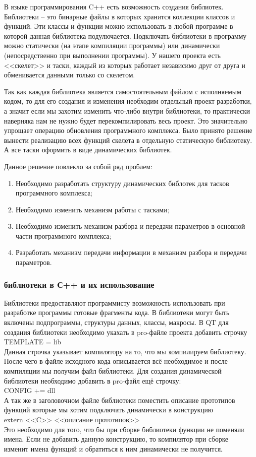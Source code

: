 В языке программирования C++ есть возможность создания библиотек. Библиотеки -- это бинарные файлы в которых хранится коллекции классов и функций. Эти классы и функции можно использовать в любой программе в которой данная библиотека подулючается. Подключать библиотеки в программу можно статически (на этапе компиляции программы) или динамически (непосредственно при выполнении программы). У нашего проекта есть <<скелет>> и таски, каждый из которых работает независимо друг от друга и обменивается данными только со скелетом. 

Так как каждая библиотека является самостоятельным файлом с исполняемым кодом, то для его создания и изменения необходим отдельный проект разработки, а значит если мы захотим изменить что-либо внутри библиотеки, то практически наверняка нам не нужно будет перекомпилировать весь проект. Это значительно упрощает операцию обновления программного комплекса. Было принято решение вынести реализацию всех функций скелета в отдельную статическую библиотеку. А все таски оформить в виде динамических библиотек. 

Данное решение повлекло за собой ряд проблем:
\begin{enumerate}
\item Необходимо разработать структуру динамических библотек для тасков программного комплекса;
\item Необходимо изменить механизм работы с тасками;
\item Необходимо изменить механизм разбора и передачи параметров в основной части программного комплекса;
\item Разработать механизм передачи информации в механизм разбора и передачи параметров.
\end{enumerate}

\subsubsection{библиотеки в С++ и их использование}

Библиотеки предоставляют программисту возможность использовать при разработке программы готовые фрагменты кода. В библиотеки могут быть включены подпрограммы, структуры данных, классы, макросы. В QT для создания библиотеки необходимо укахать в pro-файле проекта добавить строчку \\
TEMPLATE = lib\\
Данная строчка указывает компилятору на то, что мы компилируем библиотеку. После чего в файле исходного кода описывается всё необходимое и после компиляции мы получим файл библиотеки. Для создания динамической библиотеки необходимо добавить в pro-файл ещё строчку: \\
CONFIG += dll\\
А так же в заголовочном файле библиотеки поместить описание прототипов функций которые мы хотим подключать динамически в конструкцию\\
extern <<C>>{ <<описание прототипов>> }\\
Это необходимо для того, что бы при сборке библиотеки функции не поменяли имена. Если не добавить данную конструкцию, то компилятор при сборке изменит имена функций и обратиться к ним динамически не получится.

